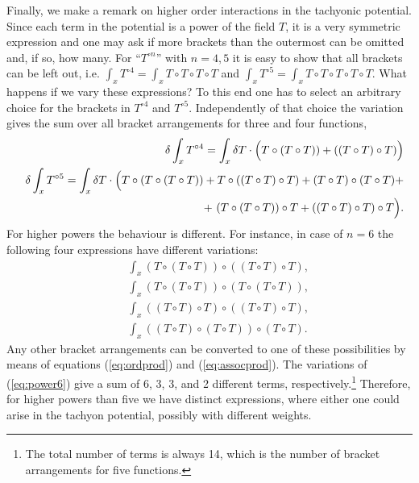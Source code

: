 \documentclass[a4paper,11pt]{article}               \def\new#1\endnew{{\bf #1}}
\begin{document}
Finally, we make a remark on higher order interactions in the
tachyonic potential. Since each term in the potential is a power of
the field $T$, it is a very symmetric expression and one may ask if
more brackets than the outermost can be omitted and, if so, how many. 
For ``$T^{\circ n}$'' with $n = 4,5$ it is easy to show that all
brackets can be left out, i.e. 
$\int_x T^{\circ 4}=\int_x T\circ T\circ T\circ T$ and 
$\int_x T^{\circ 5}=\int_x T\circ T\circ T\circ T\circ T$. 
What happens if we vary these expressions? To
this end one has to select an arbitrary choice for the brackets in
$T^{\circ 4}$ and $T^{\circ 5}$. Independently of that choice the 
variation gives the sum over all bracket arrangements for three and four
functions,
\begin{eqnarray}
  \label{eq:vary}
  && \delta \int _x T^{\circ 4} = 
     \int _x \delta T \cdot \Bigl(T\circ (T\circ T)) + 
                            ((T\circ T)\circ T)\Bigr)
\\
  && \delta \int _x T^{\circ 5} = 
     \int _x \delta T \cdot \Bigl(T \circ (T \circ (T \circ T)) +
                                  T \circ ((T \circ T) \circ T) +
                                  (T \circ T) \circ (T \circ T) +
\nonumber\\ 
  && \hspace{2.8truecm}           +~(T \circ (T \circ T)) \circ T +
                                  ((T \circ T) \circ T) \circ T \Bigr).
\end{eqnarray}
For higher powers the behaviour is different. For instance, in case of
$n=6$ the following four expressions have different variations: 
\begin{eqnarray}
  \label{eq:power6}
  &&\int _x (T \circ (T \circ T)) \circ ((T \circ T) \circ T) ,\\
  &&\int _x (T \circ (T \circ T)) \circ (T \circ (T \circ T)) ,\nonumber\\
  &&\int _x ((T \circ T) \circ T) \circ ((T \circ T) \circ T) ,\nonumber\\
  &&\int _x ((T \circ T) \circ (T \circ T)) \circ (T \circ T) .\nonumber
\end{eqnarray}
Any other bracket arrangements can be converted to one of these
possibilities by means of equations (\ref{eq:ordprod}) and
(\ref{eq:assocprod}). 
The variations of (\ref{eq:power6}) give a sum of
6, 3, 3, and 2 different terms, respectively.\footnote{%
  The total number of terms is always 14, 
  which is the number of bracket arrangements for five functions.
}
Therefore, for higher powers than five we have distinct expressions, 
where either one could arise in the tachyon potential, possibly with 
different weights.
\end{document}
